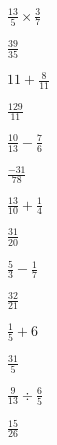 \documentclass[12pt]{exam}
\begin{document}
\begin{questions}
\begin{multicols}{2}
            \question $\frac{13}{5} \times \frac{3}{7}$

            \begin{solution}

                $\frac{39}{35}$

            \end{solution}


            \question $11 + \frac{8}{11}$

            \begin{solution}

                $\frac{129}{11}$

            \end{solution}


            \question $\frac{10}{13} - \frac{7}{6}$

            \begin{solution}

                $\frac{-31}{78}$

            \end{solution}


            \question $\frac{13}{10} + \frac{1}{4}$

            \begin{solution}

                $\frac{31}{20}$

            \end{solution}


            \question $\frac{5}{3} - \frac{1}{7}$

            \begin{solution}

                $\frac{32}{21}$

            \end{solution}


            \question $\frac{1}{5} + 6$

            \begin{solution}

                $\frac{31}{5}$

            \end{solution}


            \question $\frac{9}{13} \div \frac{6}{5}$

            \begin{solution}

                $\frac{15}{26}$

            \end{solution}



\end{multicols}
\end{questions}
\end{document}
